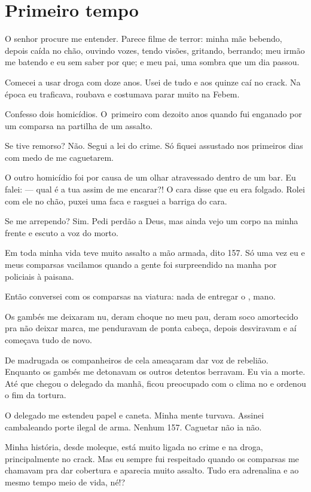  

\section{Primeiro tempo}

O senhor procure me entender. Parece filme de terror: minha mãe bebendo,
depois caída no chão, ouvindo vozes, tendo visões, gritando, berrando;
meu irmão me batendo e eu sem saber por que; e meu pai, uma sombra que um
dia passou.

\asterisc{}

Comecei a usar droga com doze anos. Usei de tudo e aos quinze caí no
crack. Na época eu traficava, roubava e costumava parar muito na Febem.

Confesso dois homicídios. O~primeiro com dezoito anos quando fui
enganado por um comparsa na partilha de um assalto.

Se tive remorso? Não. Segui a lei do crime. Só fiquei assustado nos
primeiros dias com medo de me caguetarem.

O outro homicídio foi por causa de um olhar atravessado dentro de um
bar. Eu falei: --- qual é a tua assim de me encarar?! O cara disse que
eu era folgado. Rolei com ele no chão, puxei uma faca e rasguei a
barriga do cara.

Se me arrependo? Sim. Pedi perdão a Deus, mas ainda vejo um corpo na
minha frente e escuto a voz do morto.

Em toda minha vida teve muito assalto a mão armada, dito 157. Só uma vez
eu e meus comparsas vacilamos quando a gente foi surpreendido na manha
por policiais à paisana.

Então conversei com os comparsas na viatura: nada de entregar o ,
mano.

Os gambés me deixaram nu, deram choque no meu pau, deram soco amortecido
pra não deixar marca, me penduravam de ponta cabeça, depois desviravam e
aí começava tudo de novo.

De madrugada os companheiros de cela ameaçaram dar voz de rebelião.
Enquanto os gambés me detonavam os outros detentos berravam. Eu via a
morte. Até que chegou o delegado da manhã, ficou preocupado com o clima
no  e ordenou o fim da tortura.

O delegado me estendeu papel e caneta. Minha mente turvava. Assinei
cambaleando porte ilegal de arma. Nenhum 157. Caguetar não ia não.

Minha história, desde moleque, está muito ligada no crime e na droga,
principalmente no crack. Mas eu sempre fui respeitado quando os
comparsas me chamavam pra dar cobertura e aparecia muito assalto. Tudo
era adrenalina e ao mesmo tempo meio de vida, né!?

